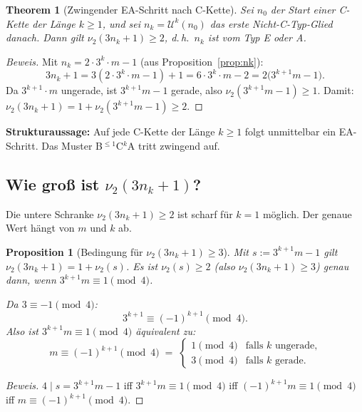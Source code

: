 \documentclass[12pt,a4paper]{article}
\newtheorem{proposition}[definition]{Proposition}
\newtheorem{theorem}[definition]{Theorem}
\newenvironment{beweis}{\begin{proof}[Beweis]}{\end{proof}}
\newcommand{\vii}{\nu_2}
\newcommand{\U}{\mathcal{U}}
\begin{document}
	\begin{theorem}[Zwingender EA-Schritt nach C-Kette]
		\label{thm:ea-nach-ck}
		Sei $n_0$ der Start einer C-Kette der Länge $k \geq 1$, und sei
		$n_k = \U^k(n_0)$ das erste Nicht-C-Typ-Glied danach.
		Dann gilt $\vii(3n_k+1) \geq 2$, d.\,h.\ $n_k$ ist vom Typ E oder A.
	\end{theorem}
	
	\begin{beweis}
		Mit $n_k = 2 \cdot 3^k \cdot m - 1$ (aus Proposition~\ref{prop:nk}):
		\[
		3n_k + 1 = 3(2 \cdot 3^k \cdot m - 1) + 1 = 6 \cdot 3^k \cdot m - 2
		= 2\bigl(3^{k+1} m - 1\bigr).
		\]
		Da $3^{k+1} \cdot m$ ungerade, ist $3^{k+1} m - 1$ gerade, also
		$\vii(3^{k+1}m - 1) \geq 1$.
		Damit: $\vii(3n_k+1) = 1 + \vii(3^{k+1}m-1) \geq 2$. \qedhere
	\end{beweis}
	
	\begin{tcolorbox}[ergebnis]
		\textbf{Strukturaussage:} Auf jede C-Kette der Länge $k \geq 1$ folgt
		unmittelbar ein EA-Schritt. Das Muster \textnormal{B}$^{\leq 1}$\textnormal{C}$^k$\textnormal{A}
		tritt zwingend auf.
	\end{tcolorbox}
	
	\subsection{Wie groß ist $\nu_2(3n_k+1)$?}
	
	Die untere Schranke $\vii(3n_k+1) \geq 2$ ist scharf für $k=1$ möglich.
	Der genaue Wert hängt von $m$ und $k$ ab.
	
	\begin{proposition}[Bedingung für $\vii(3n_k+1) \geq 3$]
		\label{prop:nu3-nach-ck}
		Mit $s := 3^{k+1}m - 1$ gilt $\vii(3n_k+1) = 1 + \vii(s)$. Es ist
		$\vii(s) \geq 2$ (also $\vii(3n_k+1) \geq 3$) genau dann, wenn
		$3^{k+1} m \equiv 1 \pmod{4}$.
		
		Da $3 \equiv -1 \pmod 4$:
		\[
		3^{k+1} \equiv (-1)^{k+1} \pmod 4.
		\]
		Also ist $3^{k+1}m \equiv 1 \pmod 4$ äquivalent zu:
		\[
		m \equiv (-1)^{k+1} \pmod 4
		\;=\;
		\begin{cases}
			1 \pmod 4 & \text{falls $k$ ungerade,}\\
			3 \pmod 4 & \text{falls $k$ gerade.}
		\end{cases}
		\]
	\end{proposition}
	
	\begin{beweis}
		$4 \mid s = 3^{k+1}m - 1$ iff $3^{k+1}m \equiv 1 \pmod 4$ iff
		$(-1)^{k+1}m \equiv 1 \pmod 4$ iff $m \equiv (-1)^{k+1} \pmod 4$.
	\end{beweis}
	
\end{document}
